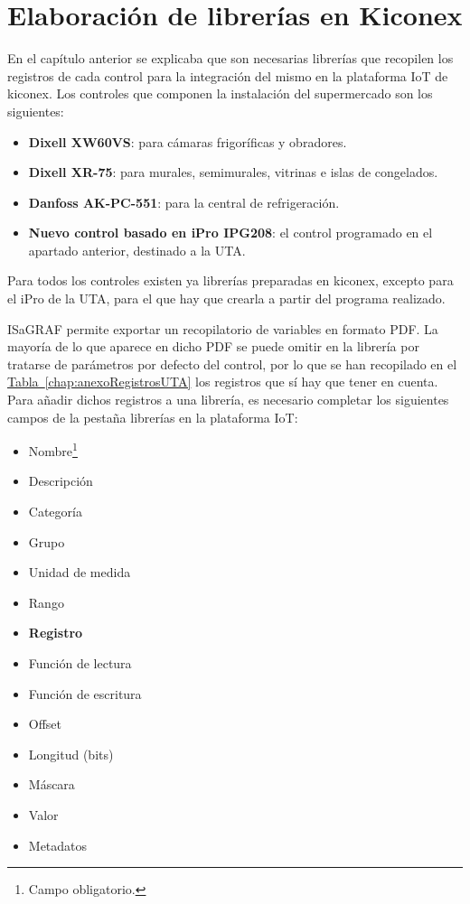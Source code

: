 \section{Elaboración de librerías en Kiconex}
\label{sec:librerias}
En el capítulo anterior se explicaba que son necesarias librerías que recopilen los registros de cada control para la integración del mismo en la plataforma IoT de kiconex. Los controles que componen la instalación del supermercado son los siguientes:

\begin{itemize}
  \item \textbf{Dixell XW60VS}: para cámaras frigoríficas y obradores.
  \item \textbf{Dixell XR-75}: para murales, semimurales, vitrinas e islas de congelados.
  \item \textbf{Danfoss AK-PC-551}: para la central de refrigeración.
  \item \textbf{Nuevo control basado en iPro IPG208}: el control programado en el apartado anterior, destinado a la UTA.
\end{itemize}

Para todos los controles existen ya librerías preparadas en kiconex, excepto para el iPro de la UTA, para el que hay que crearla a partir del programa realizado. 

ISaGRAF permite exportar un recopilatorio de variables en formato PDF. La mayoría de lo que aparece en dicho PDF se puede omitir en la librería por tratarse de parámetros por defecto del control, por lo que se han recopilado en el \hyperref[chap:anexoRegistrosUTA]{Tabla~\ref{chap:anexoRegistrosUTA}} los registros que sí hay que tener en cuenta. Para añadir dichos registros a una librería, es necesario completar los siguientes campos de la pestaña librerías en la plataforma IoT:

\begin{itemize}
  \item Nombre\footnote[1]{Campo obligatorio.}
  \item Descripción\footnotemark[1]
  \item Categoría\footnotemark[1]
  \item Grupo
  \item Unidad de medida
  \item Rango
  \item \textbf{Registro\footnotemark[1]}
  \item Función de lectura
  \item Función de escritura
  \item Offset
  \item Longitud (bits)\footnotemark[1]
  \item Máscara
  \item Valor
  \item Metadatos
\end{itemize}

